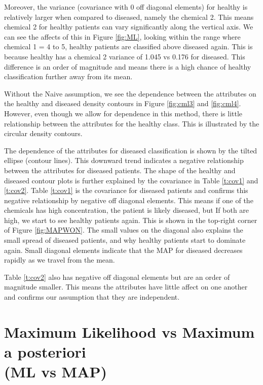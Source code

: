 {Moreover, the variance (covariance with 0 off diagonal elements) for healthy is relatively larger when compared to diseased, namely the chemical 2. This means chemical 2 for healthy patients can vary significantly along the vertical axis. We can see the affects of this in Figure \ref{fig:ML}, looking within the range where chemical 1 = 4 to 5,  healthy patients are classified above diseased again. This is because healthy has a chemical 2 variance of 1.045 vs 0.176 for diseased. This difference is an order of magnitude and means there is a high chance of healthy classification further away from its mean.

Without the Naive assumption, we see the dependence between the attributes on the healthy and diseased density contours in Figure \ref{fig:cml3} and \ref{fig:cml4}. However, even though we allow for dependence in this method, there is little relationship between the attributes for the healthy class. This is illustrated by the circular density contours.

The dependence of the attributes for diseased classification is shown by the tilted ellipse (contour lines). This downward trend indicates a negative relationship between the attributes for diseased patients. The shape of the healthy and diseased contour plots is further explained by the covariance in Table \ref{t:cov1} and \ref{t:cov2}. Table \ref{t:cov1} is the covariance for diseased patients and confirms this negative relationship by negative off diagonal elements. This means if one of the chemicals has high concentration, the patient is likely diseased, but If both are high, we start to see healthy patients again. This is shown in the top-right corner of Figure \ref{fig:MAPWON}. The small values on the diagonal also explains the small spread of diseased patients, and why healthy patients start to dominate again. Small diagonal elements indicate that the MAP for diseased decreases rapidly as we travel from the mean.

Table \ref{t:cov2} also has negative off diagonal elements but are an order of magnitude smaller. This means the attributes have little affect on one another and confirms our assumption that they are independent.


\section{Maximum Likelihood vs Maximum a posteriori \\ (ML vs MAP)}{\label{MLvMAP}
	
}}
